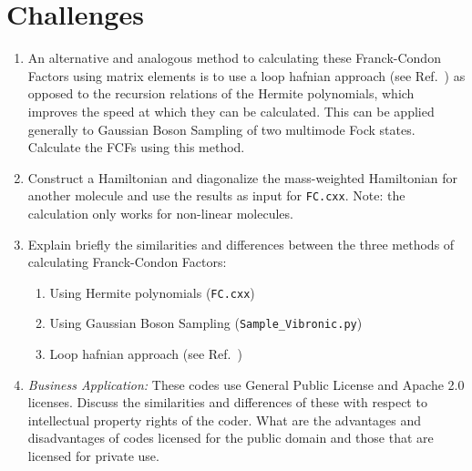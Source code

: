 \documentclass[12pt]{article}
\begin{document}
\section*{Challenges}

\begin{enumerate}
    \item An alternative and analogous method to calculating these Franck-Condon Factors using matrix elements is to use a loop hafnian approach (see Ref.~\cite{quesadaFranckCondonFactorsCounting2019}) as opposed to the recursion relations of the Hermite polynomials, which improves the speed at which they can be calculated. This can be applied generally to Gaussian Boson Sampling of two multimode Fock states. Calculate the FCFs using this method.
    \item Construct a Hamiltonian and diagonalize the mass-weighted Hamiltonian for another molecule and use the results as input for \texttt{FC.cxx}. Note: the calculation only works for non-linear molecules.
    \item Explain briefly the similarities and differences between the three methods of calculating Franck-Condon Factors:
    \begin{enumerate}
    \item Using Hermite polynomials (\texttt{FC.cxx})
    \item Using Gaussian Boson Sampling (\texttt{Sample\_Vibronic.py})
    \item Loop hafnian approach (see Ref.~\cite{quesadaFranckCondonFactorsCounting2019})
\end{enumerate}    
    \item {\it Business Application:} These codes use General Public License and Apache 2.0 licenses. Discuss the similarities and differences of these with respect to intellectual property rights of the coder. What are the advantages and disadvantages of codes licensed for the public domain and those that are licensed for private use.

    

\end{enumerate}



\newpage



\end{document}
